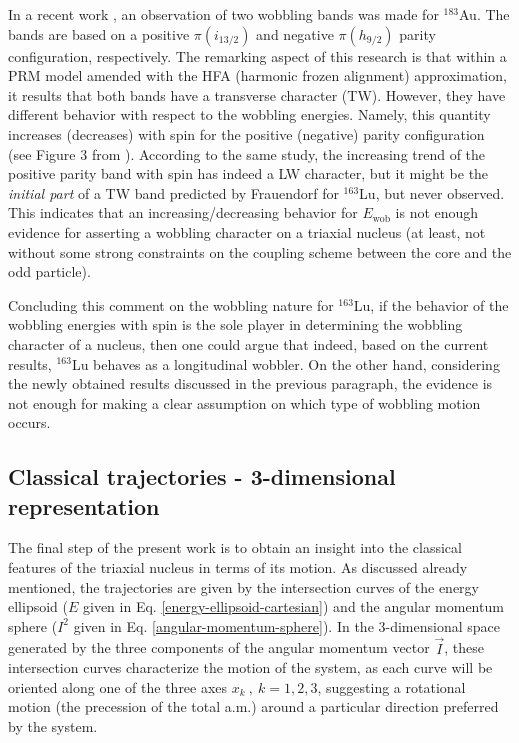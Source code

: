 \documentclass[11pt]{article}
\begin{document}
In a recent work \cite{nandi2020first}, an observation of two wobbling bands was made for $^{183}$Au. The bands are based on a positive $\pi(i_{13/2})$ and negative $\pi(h_{9/2})$ parity configuration, respectively. The remarking aspect of this research is that within a PRM model amended with the HFA (harmonic frozen alignment) approximation, it results that both bands have a transverse character (TW). However, they have different behavior with respect to the wobbling energies. Namely, this quantity increases (decreases) with spin for the positive (negative) parity configuration (see Figure 3 from \cite{nandi2020first}). According to the same study, the increasing trend of the positive parity band with spin has indeed a LW character, but it might be the \emph{initial part} of a TW band predicted by Frauendorf \cite{frauendorf2014transverse} for $^{163}$Lu, but never observed. This indicates that an increasing/decreasing behavior for $E_\text{wob}$ is not enough evidence for asserting a wobbling character on a triaxial nucleus (at least, not without some strong constraints on the coupling scheme between the core and the odd particle).

Concluding this comment on the wobbling nature for $^{163}$Lu, if the behavior of the wobbling energies with spin is the sole player in determining the wobbling character of a nucleus, then one could argue that indeed, based on the current results, $^{163}$Lu behaves as a longitudinal wobbler. On the other hand, considering the newly obtained results discussed in the previous paragraph, the evidence is not enough for making a clear assumption on which type of wobbling motion occurs.

\subsection{Classical trajectories - 3-dimensional representation}

The final step of the present work is to obtain an insight into the classical features of the triaxial nucleus in terms of its motion. As discussed already mentioned, the trajectories  are given by the intersection curves of the energy ellipsoid ($E$ given in Eq. \ref{energy-ellipsoid-cartesian}) and the angular momentum sphere ($I^2$ given in Eq. \ref{angular-momentum-sphere}). In the 3-dimensional space generated by the three components of the angular momentum vector $\vec{I}$, these intersection curves characterize the motion of the system, as each curve will be oriented along one of the three axes $x_k\ ,\ k=1,2,3$, suggesting a rotational motion (the precession of the total a.m.) around a particular direction preferred by the system.
\end{document}
